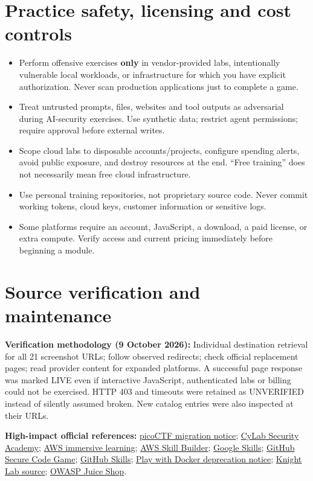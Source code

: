 \documentclass[10pt,letterpaper,oneside]{article}
\begin{document}
\section{Practice safety, licensing and cost controls}
\begin{itemize}
\item Perform offensive exercises \textbf{only} in vendor-provided labs, intentionally vulnerable local workloads, or infrastructure for which you have explicit authorization. Never scan production applications just to complete a game.
\item Treat untrusted prompts, files, websites and tool outputs as adversarial during AI-security exercises. Use synthetic data; restrict agent permissions; require approval before external writes.
\item Scope cloud labs to disposable accounts/projects, configure spending alerts, avoid public exposure, and destroy resources at the end. ``Free training'' does not necessarily mean free cloud infrastructure.
\item Use personal training repositories, not proprietary source code. Never commit working tokens, cloud keys, customer information or sensitive logs.
\item Some platforms require an account, JavaScript, a download, a paid license, or extra compute. Verify access and current pricing immediately before beginning a module.
\end{itemize}
\section{Source verification and maintenance}
\textbf{Verification methodology (9 October 2026):} Individual destination retrieval for all 21 screenshot URLs; follow observed redirects; check official replacement pages; read provider content for expanded platforms. A successful page response was marked LIVE even if interactive JavaScript, authenticated labs or billing could not be exercised. HTTP 403 and timeouts were retained as UNVERIFIED instead of silently assumed broken. New catalog entries were also inspected at their URLs.

\textbf{High-impact official references:} \href{https://picoctf.org/}{picoCTF migration notice}; \href{https://cylabacademy.org/}{CyLab Security Academy}; \href{https://aws.amazon.com/training/digital/immersive-learning/}{AWS immersive learning}; \href{https://skillbuilder.aws/}{AWS Skill Builder}; \href{https://www.skills.google/}{Google Skills}; \href{https://github.com/skills/secure-code-game}{GitHub Secure Code Game}; \href{https://learn.github.com/skills}{GitHub Skills}; \href{https://labs.play-with-docker.com/}{Play with Docker deprecation notice}; \href{https://github.com/nuknightlab/sql-mysteries}{Knight Lab source}; \href{https://owasp.org/projects/juice-shop}{OWASP Juice Shop}.
\end{document}
